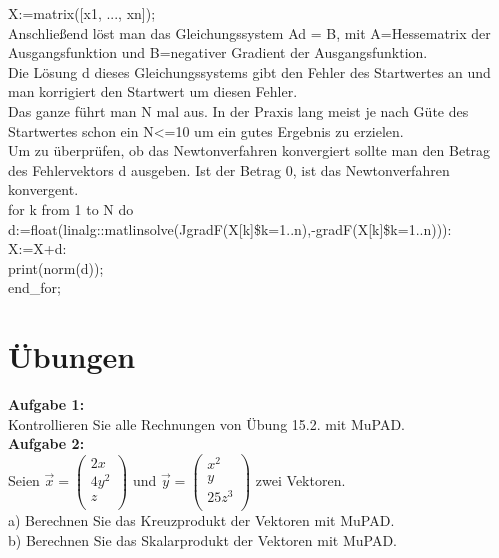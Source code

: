 \documentclass[11pt,final]{scrreprt}
\begin{document}
X:=matrix([x1, ..., xn]);\\

Anschließend löst man das Gleichungssystem Ad = B, mit A=Hessematrix der Ausgangsfunktion und B=negativer Gradient der Ausgangsfunktion.\\
Die Lösung d dieses Gleichungssystems gibt den Fehler des Startwertes an und man korrigiert den Startwert um diesen Fehler.\\
Das ganze führt man N mal aus. In der Praxis lang meist je nach Güte des Startwertes schon ein N<=10 um ein gutes Ergebnis zu erzielen.\\
Um zu überprüfen, ob das Newtonverfahren konvergiert sollte man den Betrag des Fehlervektors d ausgeben. Ist der Betrag 0, ist das Newtonverfahren konvergent.\\

for k from 1 to N do\\
\hspace*{2em}d:=float(linalg::matlinsolve(JgradF(X[k]\$k=1..n),-gradF(X[k]\$k=1..n))):\\
\hspace*{2em}X:=X+d:\\
\hspace*{2em}print(norm(d));\\
end\_for;\\

\newpage
\section{Übungen}

\textbf{Aufgabe 1:}\\
Kontrollieren Sie alle Rechnungen von Übung 15.2. mit MuPAD.\\

\textbf{Aufgabe 2:}\\
Seien $\overrightarrow{x} = \left(\begin{matrix}
2x\\
4y^2 \\
z\\
\end{matrix}\right)$ und $\overrightarrow{y} = \left(\begin{matrix}
x^2\\
y \\
25z^3\\
\end{matrix}\right)$ zwei Vektoren.\\

a) Berechnen Sie das Kreuzprodukt der Vektoren mit MuPAD.\\
b) Berechnen Sie das Skalarprodukt der Vektoren mit MuPAD.\\
\end{document}
